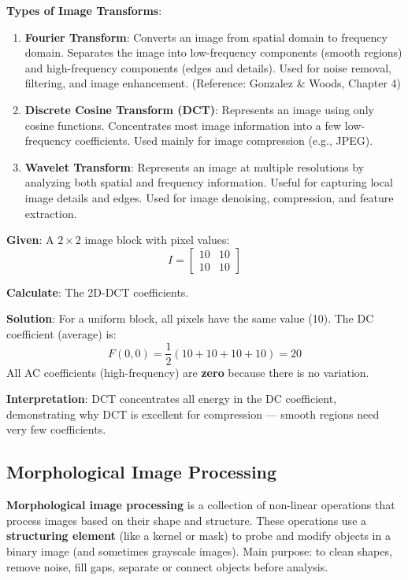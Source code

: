 \documentclass[11pt,a4paper]{article}
\begin{document}
\textbf{Types of Image Transforms}:
\begin{enumerate}
    \item \textbf{Fourier Transform}: Converts an image from spatial domain to frequency domain. Separates the image into low-frequency components (smooth regions) and high-frequency components (edges and details). Used for noise removal, filtering, and image enhancement. (Reference: Gonzalez \& Woods, Chapter 4)
    \item \textbf{Discrete Cosine Transform (DCT)}: Represents an image using only cosine functions. Concentrates most image information into a few low-frequency coefficients. Used mainly for image compression (e.g., JPEG).
    \item \textbf{Wavelet Transform}: Represents an image at multiple resolutions by analyzing both spatial and frequency information. Useful for capturing local image details and edges. Used for image denoising, compression, and feature extraction.
\end{enumerate}

\begin{tcolorbox}[colback=yellow!5!white,colframe=yellow!75!black,title=\textbf{Worked Example 3: DCT Coefficient Energy Compaction}]
\textbf{Given}: A $2 \times 2$ image block with pixel values:
\[
I = \begin{bmatrix} 10 & 10 \\ 10 & 10 \end{bmatrix}
\]

\textbf{Calculate}: The 2D-DCT coefficients.

\textbf{Solution}:
For a uniform block, all pixels have the same value (10). The DC coefficient (average) is:
\[
F(0,0) = \frac{1}{2}(10 + 10 + 10 + 10) = 20
\]
All AC coefficients (high-frequency) are \textbf{zero} because there is no variation.

\textbf{Interpretation}: DCT concentrates all energy in the DC coefficient, demonstrating why DCT is excellent for compression --- smooth regions need very few coefficients.
\end{tcolorbox}

\subsection{Morphological Image Processing}

\textbf{Morphological image processing} is a collection of non-linear operations that process images based on their shape and structure. These operations use a \textbf{structuring element} (like a kernel or mask) to probe and modify objects in a binary image (and sometimes grayscale images). Main purpose: to clean shapes, remove noise, fill gaps, separate or connect objects before analysis.
\end{document}
